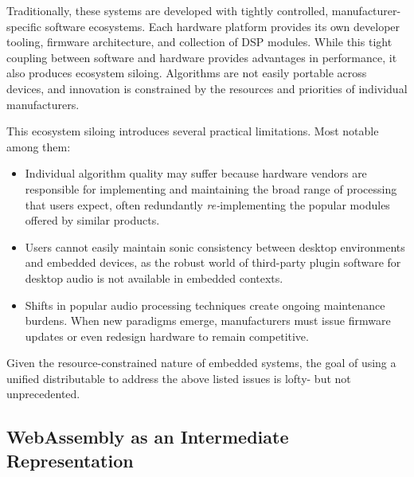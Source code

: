 \documentclass[a4paper]{article}
\begin{document}
Traditionally, these systems are developed with tightly controlled, manufacturer-specific software ecosystems\cite{10.1145/266021.266373}. Each hardware platform provides its own developer tooling, firmware architecture, and collection of DSP modules. While this tight coupling between software and hardware provides advantages in performance, it also produces ecosystem siloing. Algorithms are not easily portable across devices, and innovation is constrained by the resources and priorities of individual manufacturers.

This ecosystem siloing introduces several practical limitations. Most notable among them:

\begin{itemize}
    \item Individual algorithm quality may suffer because hardware vendors are responsible for implementing and maintaining the broad range of processing that users expect, often redundantly \textit{re-}implementing the popular modules offered by similar products.
    
    \item Users cannot easily maintain sonic consistency between desktop environments and embedded devices, as the robust world of third-party plugin software for desktop audio is not available in embedded contexts.
    
    \item Shifts in popular audio processing techniques create ongoing maintenance burdens. When new paradigms emerge, manufacturers must issue firmware updates or even redesign hardware to remain competitive.
\end{itemize}

Given the resource-constrained nature of embedded systems, the goal of using a unified distributable to address the above listed issues is lofty- but not unprecedented.




\subsection { WebAssembly as an Intermediate Representation }
\end{document}
